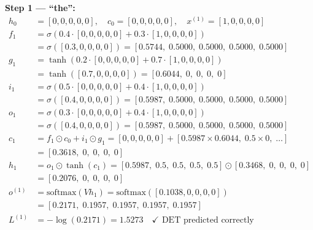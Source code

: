 \textbf{Step 1 --- ``the'':}
\begin{align*}
    h_0 &= [0,0,0,0,0], \quad c_0 = [0,0,0,0,0], \quad x^{(1)} = [1,0,0,0,0] \\[4pt]
    f_1 &= \sigma(0.4 \cdot [0,0,0,0,0] + 0.3 \cdot [1,0,0,0,0]) \\
        &= \sigma([0.3,0,0,0,0]) = [0.5744,\;0.5000,\;0.5000,\;0.5000,\;0.5000] \\[4pt]
    g_1 &= \tanh(0.2 \cdot [0,0,0,0,0] + 0.7 \cdot [1,0,0,0,0]) \\
        &= \tanh([0.7,0,0,0,0]) = [0.6044,\;0,\;0,\;0,\;0] \\[4pt]
    i_1 &= \sigma(0.5 \cdot [0,0,0,0,0] + 0.4 \cdot [1,0,0,0,0]) \\
        &= \sigma([0.4,0,0,0,0]) = [0.5987,\;0.5000,\;0.5000,\;0.5000,\;0.5000] \\[4pt]
    o_1 &= \sigma(0.3 \cdot [0,0,0,0,0] + 0.4 \cdot [1,0,0,0,0]) \\
        &= \sigma([0.4,0,0,0,0]) = [0.5987,\;0.5000,\;0.5000,\;0.5000,\;0.5000] \\[4pt]
    c_1 &= f_1 \odot c_0 + i_1 \odot g_1
         = [0,0,0,0,0] + [0.5987 \times 0.6044,\; 0.5\times 0,\;\ldots] \\
        &= [0.3618,\;0,\;0,\;0,\;0] \\[4pt]
    h_1 &= o_1 \odot \tanh(c_1)
         = [0.5987,\;0.5,\;0.5,\;0.5,\;0.5] \odot [0.3468,\;0,\;0,\;0,\;0] \\
        &= [0.2076,\;0,\;0,\;0,\;0] \\[4pt]
    o^{(1)} &= \text{softmax}(V h_1) = \text{softmax}([0.1038,0,0,0,0]) \\
            &= [0.2171,\;0.1957,\;0.1957,\;0.1957,\;0.1957] \\
    L^{(1)} &= -\log(0.2171) = 1.5273 \quad \checkmark \text{ DET predicted correctly}
\end{align*}

